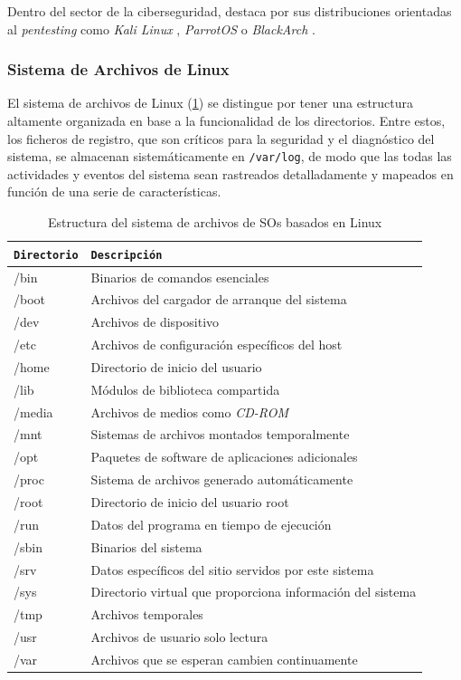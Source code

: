Dentro del sector de la ciberseguridad, destaca por sus distribuciones orientadas al \textit{pentesting} como \textit{Kali Linux} \cite{kali-linux}, \textit{ParrotOS} \cite{parrotsec-os} o \textit{BlackArch} \cite{blackarch-linux}. 

\vspace{-4mm}

\subsubsection*{Sistema de Archivos de Linux}

El sistema de archivos de Linux (\ref{tab:linux_file_systems}) se distingue por tener una estructura altamente organizada en base a la funcionalidad de los directorios. Entre estos, los ficheros de registro, que son críticos para la seguridad y el diagnóstico del sistema, se almacenan sistemáticamente en \texttt{/var/log}, de modo que las todas las actividades y eventos del sistema sean rastreados detalladamente y mapeados en función de una serie de características.

\begin{table}[H]
\centering
\footnotesize
\begin{tabularx}{\textwidth}{|l|X|}
\hline
\rowcolor{graylight}\texttt{Directorio} & \texttt{Descripción} \\
\hline
/bin & Binarios de comandos esenciales \\
\hline
/boot & Archivos del cargador de arranque del sistema \\
\hline
/dev & Archivos de dispositivo \\
\hline
/etc & Archivos de configuración específicos del host \\
\hline
/home & Directorio de inicio del usuario \\
\hline
/lib & Módulos de biblioteca compartida \\
\hline
/media & Archivos de medios como \textit{CD-ROM} \\
\hline
/mnt & Sistemas de archivos montados temporalmente \\
\hline
/opt & Paquetes de software de aplicaciones adicionales \\
\hline
/proc & Sistema de archivos generado automáticamente \\
\hline
/root & Directorio de inicio del usuario root \\
\hline
/run & Datos del programa en tiempo de ejecución \\
\hline
/sbin & Binarios del sistema \\
\hline
/srv & Datos específicos del sitio servidos por este sistema \\
\hline
/sys & Directorio virtual que proporciona información del sistema \\
\hline
/tmp & Archivos temporales \\
\hline
/usr & Archivos de usuario solo lectura \\
\hline
/var & Archivos que se esperan cambien continuamente \\
\hline
\end{tabularx}
\caption{Estructura del sistema de archivos de SOs basados en Linux}
\label{tab:linux_file_systems}
\end{table}

